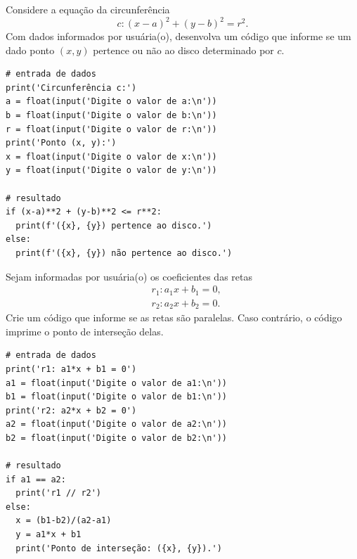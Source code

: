 \begin{exer}
  Considere a equação da circunferência
  \begin{equation}
    c: (x-a)^2 + (y-b)^2 = r^2.
  \end{equation}
  Com dados informados por usuária(o), desenvolva um código que informe se um dado ponto $(x, y)$ pertence ou não ao disco determinado por $c$.
\end{exer}
\begin{resp}

\begin{lstlisting}
# entrada de dados
print('Circunferência c:')
a = float(input('Digite o valor de a:\n'))
b = float(input('Digite o valor de b:\n'))
r = float(input('Digite o valor de r:\n'))
print('Ponto (x, y):')
x = float(input('Digite o valor de x:\n'))
y = float(input('Digite o valor de y:\n'))

# resultado
if (x-a)**2 + (y-b)**2 <= r**2:
  print(f'({x}, {y}) pertence ao disco.')
else:
  print(f'({x}, {y}) não pertence ao disco.')
\end{lstlisting}

\end{resp}

\begin{exer}\label{cap_progest_sec_ramifica:exer:intercep_retas}
  Sejam informadas por usuária(o) os coeficientes das retas
  \begin{align}
    & r_1: a_1x + b_1 = 0, \\
    & r_2: a_2x + b_2 = 0.
  \end{align}
  Crie um código que informe se as retas são paralelas. Caso contrário, o código imprime o ponto de interseção delas.
\end{exer}
\begin{resp}

\begin{lstlisting}
# entrada de dados
print('r1: a1*x + b1 = 0')
a1 = float(input('Digite o valor de a1:\n'))
b1 = float(input('Digite o valor de b1:\n'))
print('r2: a2*x + b2 = 0')
a2 = float(input('Digite o valor de a2:\n'))
b2 = float(input('Digite o valor de b2:\n'))

# resultado
if a1 == a2:
  print('r1 // r2')
else:
  x = (b1-b2)/(a2-a1)
  y = a1*x + b1
  print('Ponto de interseção: ({x}, {y}).')
\end{lstlisting}

\end{resp}

